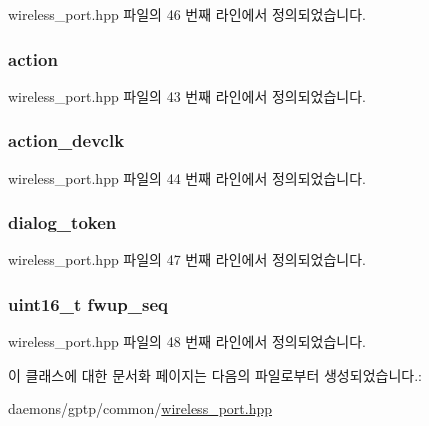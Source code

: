 wireless\+\_\+port.\+hpp 파일의 46 번째 라인에서 정의되었습니다.

\subsubsection[{\texorpdfstring{action}{action}}]{ action}\hypertarget{class_wireless_dialog_ad462f9a02358b1e73c51bca4328b8e21}{}\label{class_wireless_dialog_ad462f9a02358b1e73c51bca4328b8e21}


wireless\+\_\+port.\+hpp 파일의 43 번째 라인에서 정의되었습니다.

\subsubsection[{\texorpdfstring{action\+\_\+devclk}{action_devclk}}]{ action\+\_\+devclk}\hypertarget{class_wireless_dialog_a6694b46dc5b3e07f3e7fb085db34c24b}{}\label{class_wireless_dialog_a6694b46dc5b3e07f3e7fb085db34c24b}


wireless\+\_\+port.\+hpp 파일의 44 번째 라인에서 정의되었습니다.

\subsubsection[{\texorpdfstring{dialog\+\_\+token}{dialog_token}}]{ dialog\+\_\+token}\hypertarget{class_wireless_dialog_af4c116e249b109ded342c6ae740980ef}{}\label{class_wireless_dialog_af4c116e249b109ded342c6ae740980ef}


wireless\+\_\+port.\+hpp 파일의 47 번째 라인에서 정의되었습니다.

\subsubsection[{\texorpdfstring{fwup\+\_\+seq}{fwup_seq}}]{\setlength{\rightskip}{0pt plus 5cm}uint16\+\_\+t fwup\+\_\+seq}\hypertarget{class_wireless_dialog_a2643314d71609e165f5c5b2024fa6e96}{}\label{class_wireless_dialog_a2643314d71609e165f5c5b2024fa6e96}


wireless\+\_\+port.\+hpp 파일의 48 번째 라인에서 정의되었습니다.



이 클래스에 대한 문서화 페이지는 다음의 파일로부터 생성되었습니다.\+:\begin{DoxyCompactItemize}
\item 
daemons/gptp/common/\hyperlink{wireless__port_8hpp}{wireless\+\_\+port.\+hpp}\end{DoxyCompactItemize}
